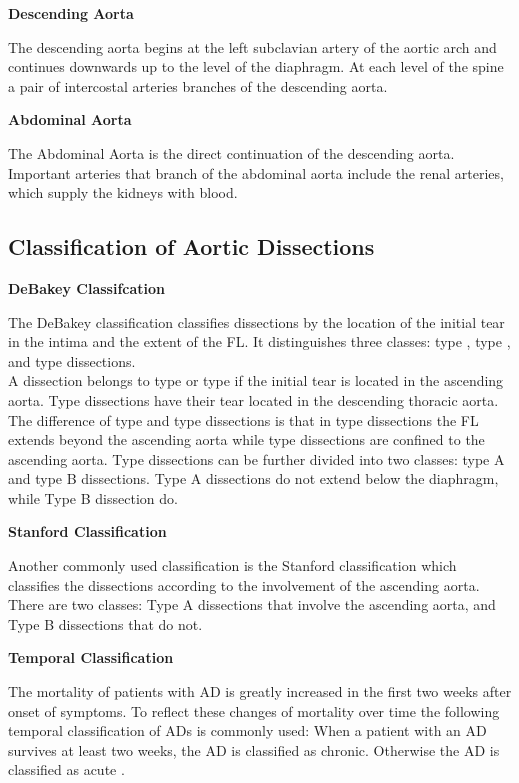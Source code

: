 \documentclass[thesis.tex]{subfiles}
\begin{document}
\textbf{Descending Aorta}

The descending aorta begins at the  left subclavian artery of the aortic arch and continues downwards up to the level of the diaphragm. At each level of the spine a pair of intercostal arteries branches of the descending aorta.

\textbf{Abdominal Aorta}

The Abdominal Aorta is the direct continuation of the descending aorta. Important arteries that branch of the abdominal aorta include the renal arteries, which supply the kidneys with blood.  

\subsection{Classification of Aortic Dissections}
\textbf{DeBakey Classifcation}

The DeBakey classification \cite{desanctis1987aortic,goldfinger2014thoracic,criado2011aortic} classifies dissections by the location of the initial tear in the intima and the extent of the FL. It distinguishes three classes: type , type , and type  dissections. \\ A dissection belongs to type  or type  if the initial tear is located in the ascending aorta. Type  dissections have their tear located in the descending thoracic aorta. The difference of type  and type  dissections is that in type  dissections the FL extends beyond the ascending aorta while type  dissections are confined to the ascending aorta. Type  dissections can be further divided into two classes: type  A and type  B dissections. Type  A dissections do not extend below the diaphragm, while Type  B dissection do.

\textbf{Stanford Classification}

Another commonly used classification is the Stanford classification \cite{desanctis1987aortic,goldfinger2014thoracic,criado2011aortic} which classifies the dissections according to the involvement of the ascending aorta. There are two classes: Type A dissections that involve the ascending aorta, and Type B dissections that do not. 

\textbf{Temporal Classification}

The mortality of patients with AD is greatly increased in the first two weeks after onset of symptoms. To reflect these changes of mortality over time the following temporal classification of ADs is commonly used: When a patient with an AD survives at least two weeks, the AD is classified as chronic. Otherwise the AD is classified as acute \cite{olsson2007thoracic,desanctis1987aortic,criado2011aortic}.
\end{document}
